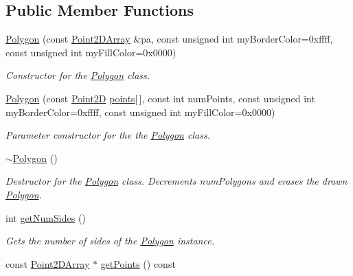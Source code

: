 \subsection*{Public Member Functions}
\begin{DoxyCompactItemize}
\item 
\hyperlink{class_polygon_afb51d4234c64281603f8b11ad23d964e}{Polygon} (const \hyperlink{class_point2_d_array}{Point2\+D\+Array} \&pa, const unsigned int my\+Border\+Color=0xffff, const unsigned int my\+Fill\+Color=0x0000)
\begin{DoxyCompactList}\small\item\em Constructor for the \hyperlink{class_polygon}{Polygon} class. \end{DoxyCompactList}\item 
\hyperlink{class_polygon_a86dc9c4f03f9874f3b1a017b913d50bb}{Polygon} (const \hyperlink{class_point2_d}{Point2\+D} \hyperlink{class_polygon_a3f17a85c09bd04138f22ae31d18b6b4d}{points}\mbox{[}$\,$\mbox{]}, const int num\+Points, const unsigned int my\+Border\+Color=0xffff, const unsigned int my\+Fill\+Color=0x0000)
\begin{DoxyCompactList}\small\item\em Parameter constructor for the the \hyperlink{class_polygon}{Polygon} class. \end{DoxyCompactList}\item 
\hypertarget{class_polygon_ace39c67107966db12e13a183f496c3b0}{\hyperlink{class_polygon_ace39c67107966db12e13a183f496c3b0}{$\sim$\+Polygon} ()}\label{class_polygon_ace39c67107966db12e13a183f496c3b0}

\begin{DoxyCompactList}\small\item\em Destructor for the \hyperlink{class_polygon}{Polygon} class. Decrements num\+Polygons and erases the drawn \hyperlink{class_polygon}{Polygon}. \end{DoxyCompactList}\item 
\hypertarget{class_polygon_a050f5dfd57856852a82a9c7912692d02}{int \hyperlink{class_polygon_a050f5dfd57856852a82a9c7912692d02}{get\+Num\+Sides} ()}\label{class_polygon_a050f5dfd57856852a82a9c7912692d02}

\begin{DoxyCompactList}\small\item\em Gets the number of sides of the \hyperlink{class_polygon}{Polygon} instance. \end{DoxyCompactList}\item 
\hypertarget{class_polygon_a807c06d03f4943e9c8e63a5848ebc5c2}{const \hyperlink{class_point2_d_array}{Point2\+D\+Array} $\ast$ \hyperlink{class_polygon_a807c06d03f4943e9c8e63a5848ebc5c2}{get\+Points} () const }\label{class_polygon_a807c06d03f4943e9c8e63a5848ebc5c2}


\end{DoxyCompactItemize}
